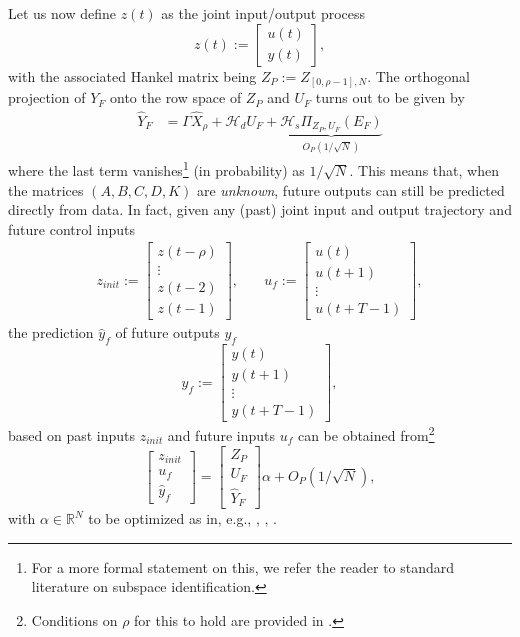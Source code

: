 \documentclass[letterpaper, 10 pt, conference]{ieeeconf}  %
\begin{document}
Let us now define $z(t)$ as the joint input/output process
\begin{equation}\label{eq:z}
	z(t):=\begin{bmatrix} u(t)\\
		y(t)
	\end{bmatrix},
\end{equation}
with the associated Hankel matrix being $Z_P\!\!:=\!Z_{[0,\rho-1],N}$. The orthogonal projection of $Y_F$ onto the row space of $Z_P$ and $U_F$ turns out to be given by
\begin{align}
	\hat{Y}_{F}&=\Gamma \hat X_{\rho} +\mathcal{H}_{d}U_{F}+ \underbrace{\mathcal{H}_{s}\Pi_{Z_{P},U_{F}}(E_F)}_{O_P(1/\sqrt{N})} \label{eq:Proj:F}
\end{align}
where the last term vanishes\footnote{For a more formal statement on this, we refer the reader to standard literature on subspace identification.} (in probability) as $1/\sqrt{N}$.
This means that, when the matrices $(A,B,C,D,K)$ are \emph{unknown}, future outputs can still be predicted directly from data. In fact, given any (past) joint input and output trajectory and future control inputs 
\begin{equation}\label{eq:zinit}
	\begin{matrix}
		z_{init}:=\begin{bmatrix}
			z(t-\rho)\\
			\vdots\\
			z(t-2)\\
			z(t-1)
		\end{bmatrix}, \quad & u_{f}:=\begin{bmatrix}
			u(t)\\
			u(t+1)\\
			\vdots\\
			u(t+T-1)
		\end{bmatrix},
	\end{matrix}
\end{equation}
the prediction $\hat y_f$ of future outputs $y_f$ 
\begin{equation}
	y_{f}:=\begin{bmatrix}
		y(t)\\
		y(t+1)\\
		\vdots\\
		y(t+T-1)
	\end{bmatrix},
\end{equation}
based on past inputs $z_{init}$ and future inputs $u_f$ 
can be obtained from\footnote{Conditions on $
	\rho$ for this to hold are provided in \cite{breschi2022role}.}
\begin{equation}\label{eq:DDPC_standard}
	\begin{bmatrix}
		z_{init}\\u_{f}\\ \hat y_{f}			
	\end{bmatrix}=\begin{bmatrix}
		Z_{P}\\U_{F}\\ \hat Y_{F}
	\end{bmatrix}\alpha + O_P(1/
	\sqrt{N}), 
\end{equation}
with $\alpha \in \mathbb{R}^{N}$ to be optimized as in, e.g., \cite{breschi2022role}, \cite{berberich2020data}, \cite{coulson2019data}. 
\end{document}
